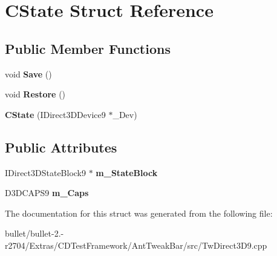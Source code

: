 \hypertarget{struct_c_state}{\section{C\+State Struct Reference}
\label{struct_c_state}
}
\subsection*{Public Member Functions}
\begin{DoxyCompactItemize}
\item 
\hypertarget{struct_c_state_a364dfdf987345acd5efdfe25d9aaa468}{void {\bfseries Save} ()}\label{struct_c_state_a364dfdf987345acd5efdfe25d9aaa468}

\item 
\hypertarget{struct_c_state_a9ac5bef63242f830f57a1eab2efa3b93}{void {\bfseries Restore} ()}\label{struct_c_state_a9ac5bef63242f830f57a1eab2efa3b93}

\item 
\hypertarget{struct_c_state_a9a49e411372f5d79e45c3ab7706f29db}{{\bfseries C\+State} (I\+Direct3\+D\+Device9 $\ast$\+\_\+\+Dev)}\label{struct_c_state_a9a49e411372f5d79e45c3ab7706f29db}

\end{DoxyCompactItemize}
\subsection*{Public Attributes}
\begin{DoxyCompactItemize}
\item 
\hypertarget{struct_c_state_ac283282cb6795f691f7de378943dac1a}{I\+Direct3\+D\+State\+Block9 $\ast$ {\bfseries m\+\_\+\+State\+Block}}\label{struct_c_state_ac283282cb6795f691f7de378943dac1a}

\item 
\hypertarget{struct_c_state_a616226cad16a32cc1df8014149a84847}{D3\+D\+C\+A\+P\+S9 {\bfseries m\+\_\+\+Caps}}\label{struct_c_state_a616226cad16a32cc1df8014149a84847}

\end{DoxyCompactItemize}


The documentation for this struct was generated from the following file\+:\begin{DoxyCompactItemize}
\item 
bullet/bullet-\/2.-\/r2704/\+Extras/\+C\+D\+Test\+Framework/\+Ant\+Tweak\+Bar/src/Tw\+Direct3\+D9.\+cpp\end{DoxyCompactItemize}

